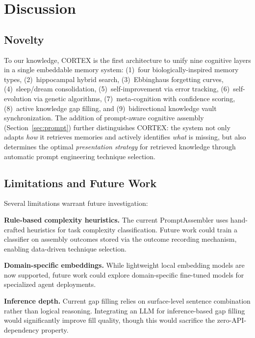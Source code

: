\documentclass[runningheads]{llncs}
\begin{document}
\section{Discussion}\label{sec:discussion}

\subsection{Novelty}

To our knowledge, CORTEX is the first architecture to unify nine cognitive layers in a single embeddable memory system: (1)~four biologically-inspired memory types, (2)~hippocampal hybrid search, (3)~Ebbinghaus forgetting curves, (4)~sleep/dream consolidation, (5)~self-improvement via error tracking, (6)~self-evolution via genetic algorithms, (7)~meta-cognition with confidence scoring, (8)~active knowledge gap filling, and (9)~bidirectional knowledge vault synchronization. The addition of prompt-aware cognitive assembly (Section~\ref{sec:prompt}) further distinguishes CORTEX: the system not only adapts \textit{how} it retrieves memories and actively identifies \textit{what} is missing, but also determines the optimal \textit{presentation strategy} for retrieved knowledge through automatic prompt engineering technique selection.

\subsection{Limitations and Future Work}

Several limitations warrant future investigation:

\textbf{Rule-based complexity heuristics.} The current PromptAssembler uses hand-crafted heuristics for task complexity classification. Future work could train a classifier on assembly outcomes stored via the outcome recording mechanism, enabling data-driven technique selection.

\textbf{Domain-specific embeddings.} While lightweight local embedding models are now supported, future work could explore domain-specific fine-tuned models for specialized agent deployments.

\textbf{Inference depth.} Current gap filling relies on surface-level sentence combination rather than logical reasoning. Integrating an LLM for inference-based gap filling would significantly improve fill quality, though this would sacrifice the zero-API-dependency property.
\end{document}

